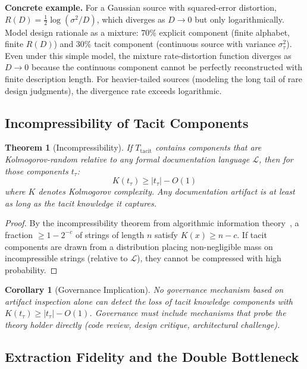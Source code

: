 \documentclass[11pt, a4paper, logo, copyright]{googledeepmind}
\newtheorem{theorem}{Theorem}[section]
\newtheorem{corollary}{Corollary}[section]
\begin{document}
\textbf{Concrete example.} For a Gaussian source with squared-error distortion, $R(D) = \frac{1}{2}\log(\sigma^2/D)$, which diverges as $D \to 0$ but only logarithmically. Model design rationale as a mixture: 70\% explicit component (finite alphabet, finite $R(D)$) and 30\% tacit component (continuous source with variance $\sigma^2_\tau$). Even under this simple model, the mixture rate-distortion function diverges as $D \to 0$ because the continuous component cannot be perfectly reconstructed with finite description length. For heavier-tailed sources (modeling the long tail of rare design judgments), the divergence rate exceeds logarithmic.

\subsection{Incompressibility of Tacit Components}

\begin{theorem}[Incompressibility]
\label{thm:incompress}
If $T_{\mathrm{tacit}}$ contains components that are Kolmogorov-random relative to any formal documentation language $\mathcal{L}$, then for those components $t_\tau$:
\begin{equation}
    K(t_\tau) \geq |t_\tau| - O(1)
\end{equation}
where $K$ denotes Kolmogorov complexity. Any documentation artifact is at least as long as the tacit knowledge it captures.
\end{theorem}

\begin{proof}
By the incompressibility theorem from algorithmic information theory~\citep{chaitin1974}, a fraction $\geq 1 - 2^{-c}$ of strings of length $n$ satisfy $K(x) \geq n - c$. If tacit components are drawn from a distribution placing non-negligible mass on incompressible strings (relative to $\mathcal{L}$), they cannot be compressed with high probability.
\end{proof}

\begin{corollary}[Governance Implication]
\label{cor:governance}
No governance mechanism based on artifact inspection alone can detect the loss of tacit knowledge components with $K(t_\tau) \geq |t_\tau| - O(1)$. Governance must include mechanisms that probe the theory holder directly (code review, design critique, architectural challenge).
\end{corollary}

\subsection{Extraction Fidelity and the Double Bottleneck}
\end{document}
